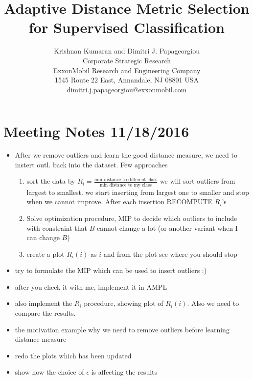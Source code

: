 \documentclass[]{article}
\title{Adaptive Distance Metric Selection for Supervised Classification}
\author{Krishnan Kumaran and Dimitri J. Papageorgiou \\
{\small Corporate Strategic Research}\\
{\small ExxonMobil Research and Engineering Company}\\
{\small 1545 Route 22 East, Annandale, NJ 08801 USA}\\
{\small dimitri.j.papageorgiou@exxonmobil.com} \\
}
\begin{document}
\maketitle



\section{Meeting Notes 11/18/2016}


\begin{itemize}
\item After we remove outliers and learn the good distance measure, we need to instert outl. back into the dataset. Few approaches
\begin{enumerate}
\item sort the data by $R_i = \frac{ \mbox{min distance to different class} }{ \mbox{min distance to my class} }$
we will sort outliers from largest to smallest.
we start inserting from largest one to smaller and stop when we cannot improve.
After each insertion RECOMPUTE $R_i$'s
\item Solve optimization procedure, MIP to decide which outliers to include with constraint that $B$ cannot change a lot (or another variant when I can change $B$)
\item create a plot $R_i(i)$ as $i$ and from the plot see where you should stop
\end{enumerate}
\end{itemize}

\begin{itemize}
\item try to formulate the MIP which can be used to insert outliers :)
\item after you check it with me, implement it in AMPL


\item also implement the $R_i$ procedure, 
showing plot of $R_i(i)$.
Also we need to compare the results.

\end{itemize}


\begin{itemize}
\item the motivation example why we need to remove outliers before learning distance measure

\item redo the plots which has been updated

\item show how the choice of $\epsilon$ is affecting the results

\end{itemize}
\end{document}
